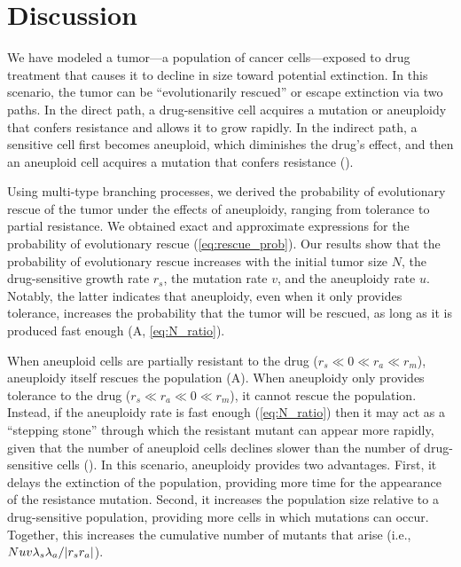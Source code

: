 \documentclass[12pt]{extarticle}
\renewcommand{\Delta}{r}
\begin{document}


\section*{Discussion}

We have modeled a tumor---a population of cancer cells---exposed to drug treatment that causes it to decline in size toward potential extinction.
In this scenario, the tumor can be ``evolutionarily rescued'' or escape extinction via two paths.
In the direct path, a drug-sensitive cell acquires a mutation or aneuploidy that confers resistance and allows it to grow rapidly.
In the indirect path, a sensitive cell first becomes aneuploid, which diminishes the drug's effect, and then an aneuploid cell acquires a mutation that confers resistance (). 

Using multi-type branching processes, we derived the probability of evolutionary rescue of the tumor under the effects of aneuploidy, ranging from tolerance to partial resistance.
We obtained exact and approximate expressions for the probability of evolutionary rescue (\cref{eq:rescue_prob}). 
Our results show that the probability of evolutionary rescue increases with the initial tumor size $N$, the drug-sensitive growth rate $\Delta_s$, the mutation rate $v$, and the aneuploidy rate $u$. Notably, the latter indicates that aneuploidy, even when it only provides tolerance, increases the probability that the tumor will be rescued, as long as it is produced fast enough (A, \cref{eq:N_ratio}).  

When aneuploid cells are partially resistant to the drug ($\Delta_s\ll0\ll\Delta_a\ll\Delta_m$), aneuploidy itself rescues the population (A). 
When aneuploidy only provides tolerance to the drug ($\Delta_s\ll\Delta_a\ll0\ll\Delta_m$), it cannot rescue the population.
Instead, if the aneuploidy rate is fast enough (\cref{eq:N_ratio}) then it may act as a ``stepping stone'' through which the resistant mutant can appear more rapidly, given that the number of aneuploid cells declines slower than the number of drug-sensitive cells (). 
In this scenario, aneuploidy provides two advantages. First, it delays the extinction of the population, providing more time for the appearance of the resistance mutation. 
Second, it increases the population size relative to a drug-sensitive population, providing more cells in which mutations can occur. 
Together, this increases the cumulative number of mutants that arise (i.e., $N u v \lambda_s \lambda_a / \abs{\Delta_s \Delta_a}$). %
\end{document}

